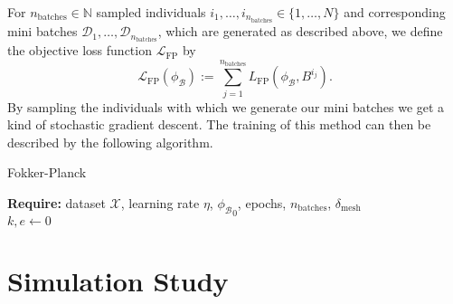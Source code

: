 \documentclass[11pt,titlepage]{article}
\newcommand{\N}{\mathbb{N}} %
\theoremstyle{definition}
\theoremstyle{remark}
\begin{document}
	For $n_\mathrm{batches}\in\N$ sampled individuals $i_1,\ldots,i_{n_\mathrm{batches}}\in\{1,\ldots,N\}$ and corresponding mini batches $\mathcal{D}_1,\ldots,\mathcal{D}_{n_\mathrm{batches}}$, which are generated as described above, we define the objective loss function $\mathcal{L}_\mathrm{FP}$ by
	\[\mathcal{L}_\mathrm{FP}(\phi_\mathcal{B}):= \sum_{j=1}^{n_\mathrm{batches}}L_\mathrm{FP}(\phi_\mathcal{B},B^{i_j}).\]
	By sampling the individuals with which we generate our mini batches we get a kind of stochastic gradient descent. The training of this method can then be described by the following algorithm.
	\begin{algorithm}
		\caption{Fokker-Planck} \label{Algo Fokker Planck}
		\textbf{Require:} dataset $\mathcal{X}$, learning rate $\eta$, ${\phi_\mathcal{B}}_0$, epochs, $n_{\mathrm{batches}}$, $\delta_\mathrm{mesh}$\\
		$k,e\gets 0$\\
	\end{algorithm}
	

	\clearpage
	\newpage
	
	
	\section{Simulation Study} \label{Kap. Simulation study}
	
\end{document}
